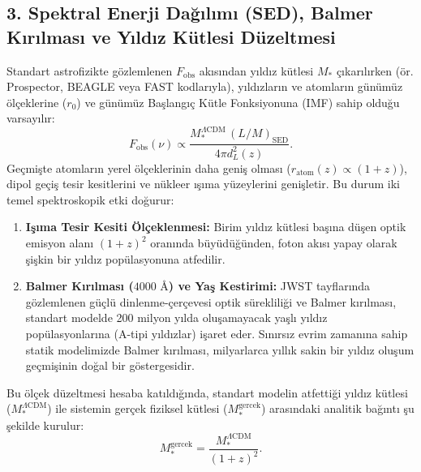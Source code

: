 \documentclass[11pt,a4paper]{article}
\begin{document}
\subsection{3. Spektral Enerji Dağılımı (SED), Balmer Kırılması ve Yıldız Kütlesi Düzeltmesi}
Standart astrofizikte gözlemlenen $F_{\mathrm{obs}}$ akısından yıldız kütlesi $M_*$ çıkarılırken (ör. Prospector, BEAGLE veya FAST kodlarıyla), yıldızların ve atomların günümüz ölçeklerine ($r_0$) ve günümüz Başlangıç Kütle Fonksiyonuna (IMF) sahip olduğu varsayılır:
\begin{equation}
    F_{\mathrm{obs}}(\nu) \propto \frac{M_*^{\Lambda\mathrm{CDM}} \, (L/M)_{\mathrm{SED}}}{4\pi d_L^2(z)}.
\end{equation}
Geçmişte atomların yerel ölçeklerinin daha geniş olması ($r_{\mathrm{atom}}(z) \propto (1+z)$), dipol geçiş tesir kesitlerini ve nükleer ışıma yüzeylerini genişletir. Bu durum iki temel spektroskopik etki doğurur:
\begin{enumerate}
    \item \textbf{Işıma Tesir Kesiti Ölçeklenmesi:} Birim yıldız kütlesi başına düşen optik emisyon alanı $(1+z)^2$ oranında büyüdüğünden, foton akısı yapay olarak şişkin bir yıldız popülasyonuna atfedilir.
    \item \textbf{Balmer Kırılması ($4000\text{ \AA}$) ve Yaş Kestirimi:} JWST tayflarında gözlemlenen güçlü dinlenme-çerçevesi optik sürekliliği ve Balmer kırılması, standart modelde 200 milyon yılda oluşamayacak yaşlı yıldız popülasyonlarına (A-tipi yıldızlar) işaret eder. Sınırsız evrim zamanına sahip statik modelimizde Balmer kırılması, milyarlarca yıllık sakin bir yıldız oluşum geçmişinin doğal bir göstergesidir.
\end{enumerate}

Bu ölçek düzeltmesi hesaba katıldığında, standart modelin atfettiği yıldız kütlesi ($M_*^{\Lambda\mathrm{CDM}}$) ile sistemin gerçek fiziksel kütlesi ($M_*^{\mathrm{gercek}}$) arasındaki analitik bağıntı şu şekilde kurulur:
\begin{equation}
    \boxed{ M_*^{\mathrm{gercek}} = \frac{M_*^{\Lambda\mathrm{CDM}}}{(1+z)^2}. }
    \label{eq:kutle_duzeltme}
\end{equation}
\end{document}
